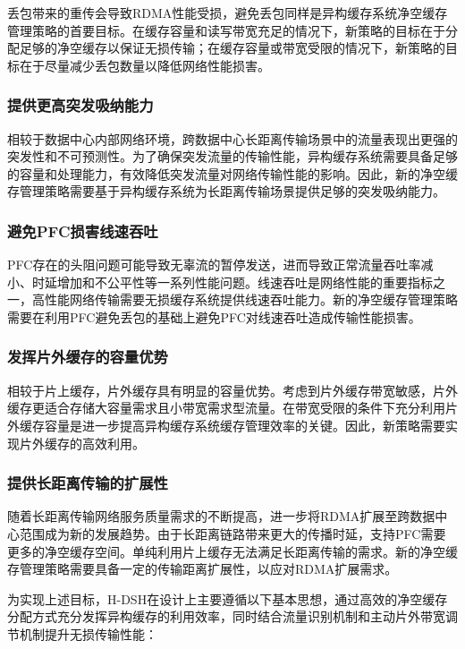 丢包带来的重传会导致RDMA性能受损，避免丢包同样是异构缓存系统净空缓存管理策略的首要目标。在缓存容量和读写带宽充足的情况下，新策略的目标在于分配足够的净空缓存以保证无损传输；在缓存容量或带宽受限的情况下，新策略的目标在于尽量减少丢包数量以降低网络性能损害。

\subsubsection{提供更高突发吸纳能力}

相较于数据中心内部网络环境，跨数据中心长距离传输场景中的流量表现出更强的突发性和不可预测性。为了确保突发流量的传输性能，异构缓存系统需要具备足够的容量和处理能力，有效降低突发流量对网络传输性能的影响。因此，新的净空缓存管理策略需要基于异构缓存系统为长距离传输场景提供足够的突发吸纳能力。

\subsubsection{避免PFC损害线速吞吐}

PFC存在的头阻问题可能导致无辜流的暂停发送，进而导致正常流量吞吐率减小、时延增加和不公平性等一系列性能问题。线速吞吐是网络性能的重要指标之一，高性能网络传输需要无损缓存系统提供线速吞吐能力。新的净空缓存管理策略需要在利用PFC避免丢包的基础上避免PFC对线速吞吐造成传输性能损害。

\subsubsection{发挥片外缓存的容量优势}

相较于片上缓存，片外缓存具有明显的容量优势。考虑到片外缓存带宽敏感，片外缓存更适合存储大容量需求且小带宽需求型流量。在带宽受限的条件下充分利用片外缓存容量是进一步提高异构缓存系统缓存管理效率的关键。因此，新策略需要实现片外缓存的高效利用。

\subsubsection{提供长距离传输的扩展性}

随着长距离传输网络服务质量需求的不断提高，进一步将RDMA扩展至跨数据中心范围成为新的发展趋势。由于长距离链路带来更大的传播时延，支持PFC需要更多的净空缓存空间。单纯利用片上缓存无法满足长距离传输的需求。新的净空缓存管理策略需要具备一定的传输距离扩展性，以应对RDMA扩展需求。


\label{c4:s3:ss2:key ideas}

为实现上述目标，H-DSH在设计上主要遵循以下基本思想，通过高效的净空缓存分配方式充分发挥异构缓存的利用效率，同时结合流量识别机制和主动片外带宽调节机制提升无损传输性能：

